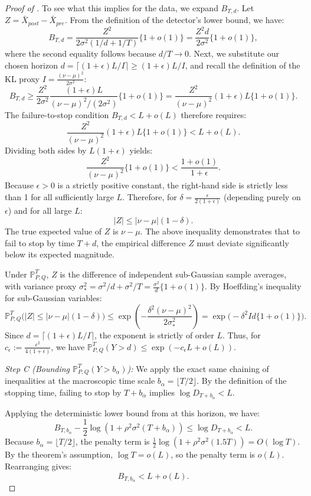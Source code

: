 \documentclass[12pt]{article}
\theoremstyle{spaced}
\theoremstyle{remark}
\begin{document}
\begin{proof}[Proof of ]
To see what this implies for the data, we expand $B_{T,d}$. Let $Z = \bar{X}_{post} - \bar{X}_{pre}$. From the definition of the detector's lower bound, we have:
\[
    B_{T,d} = \frac{Z^2}{2\sigma^2(1/d + 1/T)}\{1+o(1)\} = \frac{Z^2 d}{2\sigma^2}\{1+o(1)\},
\]
where the second equality follows because $d/T \to 0$. Next, we substitute our chosen horizon $d = \lceil(1+\epsilon)L/I\rceil \ge (1+\epsilon)L/I$, and recall the definition of the KL proxy $I = \frac{(\nu-\mu)^2}{2\sigma^2}$:
\[
    B_{T,d} \ge \frac{Z^2}{2\sigma^2} \frac{(1+\epsilon)L}{(\nu-\mu)^2 / (2\sigma^2)} \{1+o(1)\} = \frac{Z^2}{(\nu-\mu)^2}(1+\epsilon)L \{1+o(1)\}.
\]
The failure-to-stop condition $B_{T,d} < L + o(L)$ therefore requires:
\[
    \frac{Z^2}{(\nu-\mu)^2}(1+\epsilon)L \{1+o(1)\} < L + o(L).
\]
Dividing both sides by $L (1+\epsilon)$ yields:
\[
    \frac{Z^2}{(\nu-\mu)^2} \{1+o(1)\} < \frac{1 + o(1)}{1+\epsilon}.
\]
Because $\epsilon > 0$ is a strictly positive constant, the right-hand side is strictly less than 1 for all sufficiently large $L$. Therefore, for $\delta =\frac{\epsilon}{2(1+\epsilon)}$ (depending purely on $\epsilon$) and for all large $L$:
\[
    |Z| \le |\nu-\mu|(1-\delta).
\]
The true expected value of $Z$ is $\nu - \mu$. The above inequality demonstrates that to fail to stop by time $T+d$, the empirical difference $Z$ must deviate significantly below its expected magnitude. 

Under $\mathbb{P}^T_{P,Q}$, $Z$ is the difference of independent sub-Gaussian sample averages, with variance proxy $\sigma_*^2 = \sigma^2/d + \sigma^2/T = \frac{\sigma^2}{d}\{1+o(1)\}$. By Hoeffding's inequality for sub-Gaussian variables:
\[
    \mathbb{P}^T_{P,Q}\big(|Z| \le |\nu-\mu|(1-\delta)\big) \le \exp\left( - \frac{\delta^2 (\nu-\mu)^2}{2 \sigma_*^2} \right) = \exp\Big( - \delta^2 I d \{1+o(1)\} \Big).
\]
Since $d = \lceil(1+\epsilon)L/I\rceil$, the exponent is strictly of order $L$. Thus, for $c_\epsilon:=\frac{\epsilon^2}{4(1+\epsilon)}$, we have $\mathbb{P}^T_{P,Q}(Y > d) \le \exp(-c_\epsilon L + o(L))$.

\textit{Step C (Bounding $\mathbb{P}^T_{P,Q}(Y > b_\alpha)$):} 
We apply the exact same chaining of inequalities at the macroscopic time scale $b_\alpha = \lfloor T/2 \rfloor$. By the definition of the stopping time, failing to stop by $T + b_\alpha$ implies $\log D_{T+b_\alpha} < L$. 

Applying the deterministic lower bound from  at this horizon, we have:
\[
    B_{T,b_\alpha} - \frac{1}{2}\log(1+\rho^2\sigma^2(T+b_\alpha)) \le \log D_{T+b_\alpha} < L.
\]
Because $b_\alpha = \lfloor T/2 \rfloor$, the penalty term is $\frac{1}{2}\log(1+\rho^2\sigma^2(1.5T)) = O(\log T)$. By the theorem's assumption, $\log T = o(L)$, so the penalty term is $o(L)$. Rearranging gives:
\[
    B_{T,b_\alpha} < L + o(L).
\]


\end{proof}
\end{document}
